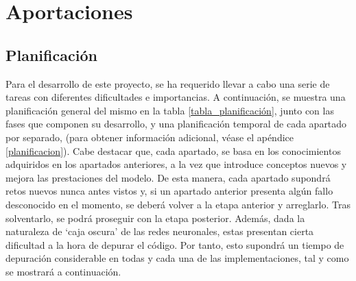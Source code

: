\chapter{Aportaciones}

\section{Planificación}

Para el desarrollo de este proyecto, se ha requerido llevar a cabo una serie de tareas con diferentes dificultades e importancias. A continuación, se muestra una planificación general del mismo en la tabla \ref{tabla_planificación}, junto con las fases que componen su desarrollo, y una planificación temporal de cada apartado por separado,  (para obtener información adicional, véase el apéndice \ref{planificacion}). Cabe destacar que, cada apartado, se basa en los conocimientos adquiridos en los apartados anteriores, a la vez que introduce conceptos nuevos y mejora las prestaciones del modelo. De esta manera, cada apartado supondrá retos nuevos nunca antes vistos y, si un apartado anterior presenta algún fallo desconocido en el momento, se deberá volver a la etapa anterior y arreglarlo. Tras solventarlo, se podrá proseguir con la etapa posterior. Además, dada la naturaleza de `caja oscura' de las redes neuronales, estas presentan cierta dificultad a la hora de depurar el código. Por tanto, esto supondrá un tiempo de depuración considerable en todas y cada una de las implementaciones, tal y como se mostrará a continuación.

